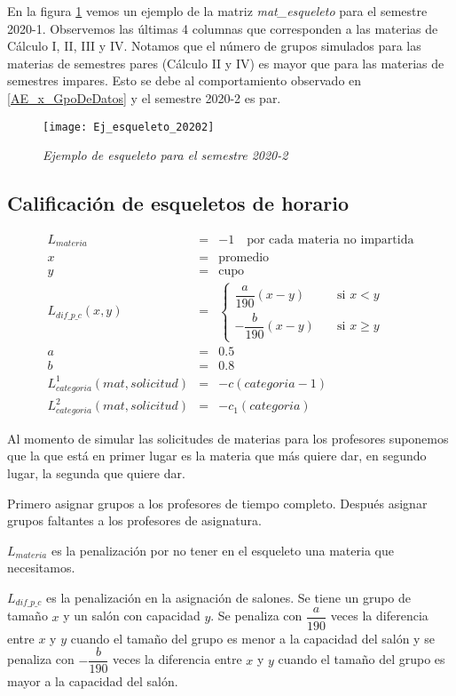 En la figura \ref{esqueleto20202} vemos un ejemplo de la matriz \textit{mat\_esqueleto} para el semestre 2020-1. Observemos las últimas 4 columnas que corresponden a las materias de Cálculo I, II, III y IV. Notamos que el número de grupos simulados para las materias de semestres pares (Cálculo II y IV) es mayor que para las materias de semestres impares. Esto se debe al comportamiento observado en \ref{AE_x_GpoDeDatos} y el semestre 2020-2 es par.

\begin{figure}[H]
\centering
\texttt{[image: Ej\_esqueleto\_20202]} %
\caption{\textit{Ejemplo de esqueleto para el semestre 2020-2}}\label{esqueleto20202}
\end{figure}

\subsection{Calificación de esqueletos de horario}

\begin{eqnarray*}
L_{materia} &=& -1 \,\,\,\,\,\,  \text{por cada materia no impartida}\\
x &=& \text{promedio}\\
y &=& \text{cupo}\\
L_{dif\_p\_c} (x,y) &=& \begin{cases}
    \dfrac{a}{190} (x-y)  & \quad \text{si } x<y\\
    - \dfrac{b}{190} (x-y)  & \quad \text{si } x\geqslant y
  \end{cases}\\
a &=& 0.5\\
b &=& 0.8\\
L_{categoria}^{1} (mat,solicitud) &=& -c(categoria - 1)\\
L_{categoria}^{2} (mat,solicitud) &=& -c_{1}(categoria)
\end{eqnarray*}

Al momento de simular las solicitudes de materias para los profesores suponemos que la que está en primer lugar es la materia que más quiere dar, en segundo lugar, la segunda que quiere dar.

Primero asignar grupos a los profesores de tiempo completo. Después asignar grupos faltantes a los profesores de asignatura.

$L_{materia}$ es la penalización por no tener en el esqueleto una materia que necesitamos.

$L_{dif\_p\_c}$ es la penalización en la asignación de salones. Se tiene un grupo de tamaño $x$ y un salón con capacidad $y$. Se penaliza con $\dfrac{a}{190}$ veces la diferencia entre $x$ y $y$ cuando el tamaño del grupo es menor a la capacidad del salón y se penaliza con $-\dfrac{b}{190}$ veces la diferencia entre $x$ y $y$ cuando el tamaño del grupo es mayor a la capacidad del salón.

